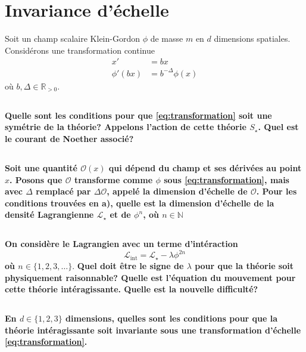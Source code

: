 \documentclass{article}
\numberwithin{equation}{section}
\theoremstyle{solution}
\begin{document}
\section{Invariance d'échelle}
Soit un champ scalaire Klein-Gordon $\phi$ de masse $m$ en $d$ dimensions spatiales. Considérons une transformation continue
\begin{align}
        \label{eq:transformation}
        x' &= bx \\
       \phi'(bx) &= b^{-\Delta}\phi(x)  
\end{align}
où $b,\Delta \in \mathbb{R}_{>0}$.

\subsection{}
\textbf{Quelle sont les conditions pour que \eqref{eq:transformation} soit une symétrie de la théorie? Appelons l’action
de cette théorie $S_{\star}$. Quel est le courant de Noether associé?}
\subsection{}
\textbf{Soit une quantité $\mathcal{O}(x)$ qui dépend du champ et ses dérivées au point $x$. Posons que $\mathcal{O}$ 
transforme comme $\phi$ sous \eqref{eq:transformation}, mais avec $\Delta$ remplacé par $\Delta \mathcal{O}$, appelé la dimension d’échelle
de $\mathcal{O}$. Pour les conditions trouvées en a), quelle est la dimension d’échelle de la densité
Lagrangienne $\mathcal{L}_{\star}$ et de $\phi^{n}$, où $n \in \mathbb{N}$}
\subsection{}
\textbf{On considère le Lagrangien avec un terme d'intéraction}
\begin{equation}\label{eq:Lagrangien2c}
       \mathcal{L}_{\mathrm{int}} = \mathcal{L}_{\star} - \lambda \phi^{2n} 
\end{equation} 
\textbf{où $n \in \{1,2,3,\dots \}$}.
\textbf{Quel doit être le signe de $\lambda$ pour que la théorie soit physiquement 
raisonnable? Quelle est l’équation du mouvement pour cette théorie intéragissante. Quelle est la nouvelle difficulté?}
\subsection{}
\textbf{En $d \in \{1,2,3\}$ dimensions, quelles sont les conditions pour que la théorie intéragissante soit invariante
sous une transformation d’échelle \eqref{eq:transformation}.}
\end{document}

